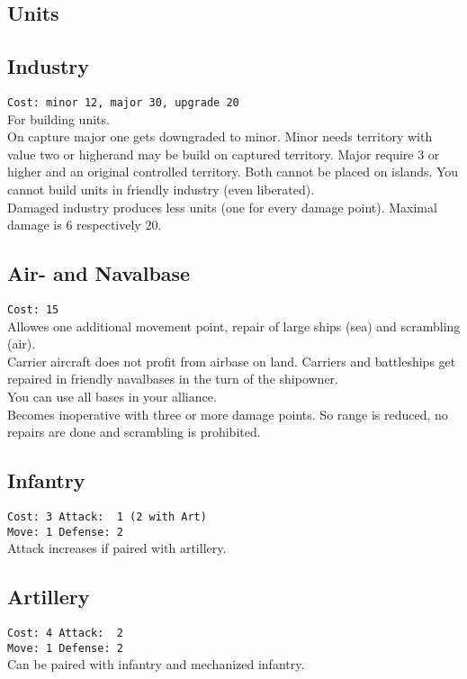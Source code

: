 \documentclass[10pt,twoside]{article}
\begin{document}
\begin{multicols*}{3}
\pagebreak

\section*{Units}
\subsection*{Industry}
\texttt{Cost: minor 12, major 30, upgrade 20}\\
For building units.\\
On capture major one gets downgraded to minor.
Minor needs territory with value two or higherand may be build on captured territory. Major require 3 or higher and an original controlled territory. Both cannot be placed on islands. You cannot build units in friendly industry (even liberated).\\
Damaged industry produces less units (one for every damage point). Maximal damage is 6 respectively 20.

\subsection*{Air- and Navalbase}
\texttt{Cost: 15}\\
Allowes one additional movement point, repair of large ships (sea) and scrambling (air).\\
Carrier aircraft does not profit from airbase on land. Carriers and battleships get repaired in friendly navalbases in the turn of the shipowner.
\\You can use all bases in your alliance.\\
Becomes inoperative with three or more damage points. So range is reduced, no repairs are done and scrambling is prohibited.

\subsection*{Infantry}
\texttt{Cost: 3 \quad\quad\quad Attack: ~1 (2 with Art) \\ Move: 1 \quad\quad\quad Defense: 2 \\ }
Attack increases if paired with artillery.

\subsection*{Artillery}
\texttt{Cost: 4 \quad\quad\quad Attack: ~2 \\ Move: 1 \quad\quad\quad Defense: 2 \\ }
Can be paired with infantry and mechanized infantry.


\end{multicols*}
\end{document}
